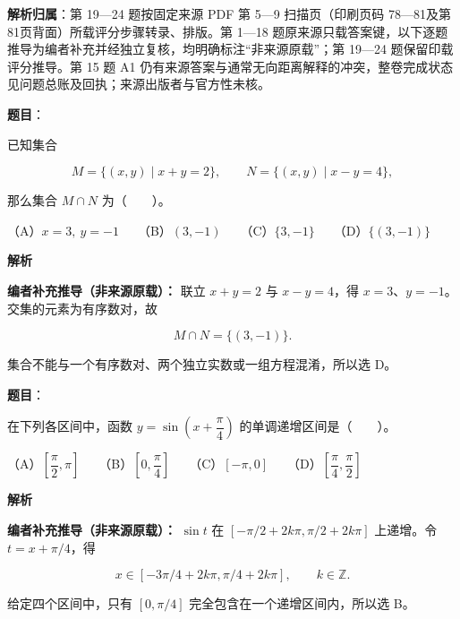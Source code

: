 

\begin{gknotice}
\textbf{解析归属}：第 19—24 题按固定来源 PDF 第 5—9 扫描页（印刷页码 78—81及第81页背面）所载评分步骤转录、排版。第 1—18 题原来源只载答案键，以下逐题推导为编者补充并经独立复核，均明确标注“非来源原载”；第 19—24 题保留印载评分推导。第 15 题 A1 仍有来源答案与通常无向距离解释的冲突，整卷完成状态见问题总账及回执；来源出版者与官方性未核。
\end{gknotice}

\begin{answer}

\textbf{题目}：

已知集合

\nopagebreak[4]
\[
M=\{(x,y)\mid x+y=2\},\qquad N=\{(x,y)\mid x-y=4\},
\]

那么集合 $M\cap N$ 为\mbox{（　　）}。

（A）$x=3,\ y=-1$　　（B）$(3,-1)$　　（C）$\{3,-1\}$　　（D）$\{(3,-1)\}$

\textbf{解析}

\textbf{编者补充推导（非来源原载）：} 联立 $x+y=2$ 与 $x-y=4$，得 $x=3$、$y=-1$。交集的元素为有序数对，故

\nopagebreak[4]
\[M\cap N=\{(3,-1)\}.\]

集合不能与一个有序数对、两个独立实数或一组方程混淆，所以选 D。


\end{answer}
\begin{answer}

\textbf{题目}：

在下列各区间中，函数 $y=\sin\left(x+\dfrac{\pi}{4}\right)$ 的单调递增区间是\mbox{（　　）}。

（A）$\left[\dfrac{\pi}{2},\pi\right]$　　（B）$\left[0,\dfrac{\pi}{4}\right]$　　（C）$[-\pi,0]$　　（D）$\left[\dfrac{\pi}{4},\dfrac{\pi}{2}\right]$

\textbf{解析}

\textbf{编者补充推导（非来源原载）：} $\sin t$ 在 $[-\pi/2+2k\pi,\pi/2+2k\pi]$ 上递增。令 $t=x+\pi/4$，得

\nopagebreak[4]
\[x\in[-3\pi/4+2k\pi,\pi/4+2k\pi],\qquad k\in\mathbb Z.\]

给定四个区间中，只有 $[0,\pi/4]$ 完全包含在一个递增区间内，所以选 B。


\end{answer}
